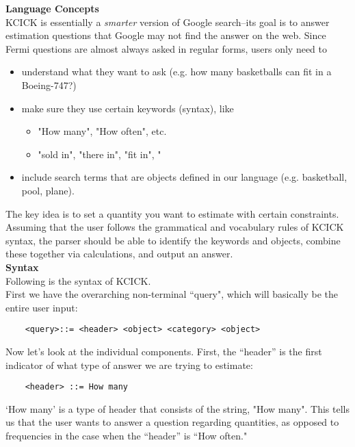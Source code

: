 \documentclass{article}
\begin{document}
{\large{\textbf{Language Concepts }}}\\  

KCICK is essentially a \emph{smarter} version of Google search--its goal is to answer estimation questions that Google may not find the answer on the web. Since Fermi questions are almost always asked in regular forms, users only need to 
\begin{itemize}
    \item understand what they want to ask (e.g. how many basketballs can fit in a Boeing-747?)
    \item make sure they use certain keywords (syntax), like 
    \begin{itemize}
        \item "How many", "How often", etc.
        \item "sold in", "there in", "fit in", "
    \end{itemize}
    \item include search terms that are objects defined in our language (e.g. basketball, pool, plane).
\end{itemize}
The key idea is to set a quantity you want to estimate with certain constraints. Assuming that the user follows the grammatical and vocabulary rules of KCICK syntax, the parser should be able to identify the keywords and objects, combine these together via calculations, and output an answer. \\

\newpage
{\large{\textbf{Syntax }}}\\

Following is the syntax of KCICK.  \\

First we have the overarching non-terminal ``query", which will basically be the entire user input:
\begin{verbatim}
    <query>::= <header> <object> <category> <object>
\end{verbatim}

Now let's look at the individual components. 
First, the ``header'' is the first indicator of what type of answer we are trying to estimate: 
\begin{verbatim}
    <header> ::= How many 
\end{verbatim}
`How many' is a type of header that consists of the string, "How many". This tells us that the user wants to answer a question regarding quantities, as opposed to frequencies in the case when the ``header'' is ``How often."\\
\end{document}
